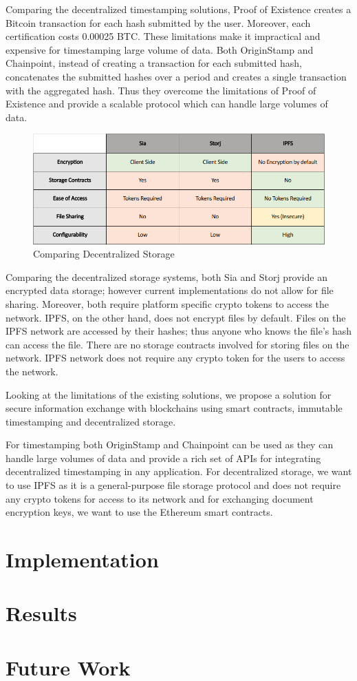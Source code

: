 \documentclass[]{report}
\begin{document}
		Comparing the decentralized timestamping solutions, Proof of Existence creates a Bitcoin transaction for each hash submitted by the user. Moreover, each certification costs 0.00025 BTC. These limitations make it impractical and expensive for timestamping large volume of data. Both OriginStamp and Chainpoint, instead of creating a transaction for each submitted hash, concatenates the submitted hashes over a period and creates a single transaction with the aggregated hash. Thus they overcome the limitations of Proof of Existence and provide a scalable protocol which can handle large volumes of data.
	
		\begin{figure}[h]
			\includegraphics[width=\linewidth]{comparison-storage.png}
			\caption{Comparing Decentralized Storage}
			\label{fig:comparison-storage}
		\end{figure}
	
		Comparing the decentralized storage systems, both Sia and Storj provide an encrypted data storage; however current implementations do not allow for file sharing. Moreover, both require platform specific crypto tokens to access the network. IPFS, on the other hand, does not encrypt files by default. Files on the IPFS network are accessed by their hashes; thus anyone who knows the file’s hash can access the file. There are no storage contracts involved for storing files on the network. IPFS network does not require any crypto token for the users to access the network.
		
		Looking at the limitations of the existing solutions, we propose a solution for secure information exchange  with blockchains using smart contracts, immutable timestamping and decentralized storage.
		
		For timestamping both OriginStamp and Chainpoint can be used as they can handle large volumes of data and provide a rich set of APIs for integrating decentralized timestamping in any application. For decentralized storage, we want to use IPFS as it is a general-purpose file storage protocol and does not require any crypto tokens for access to its network and for exchanging document encryption keys, we want to use the Ethereum smart contracts.
	
	\section*{Implementation}
	
	\section*{Results}
	
	\section*{Future Work}
	
	
	
\end{document}
